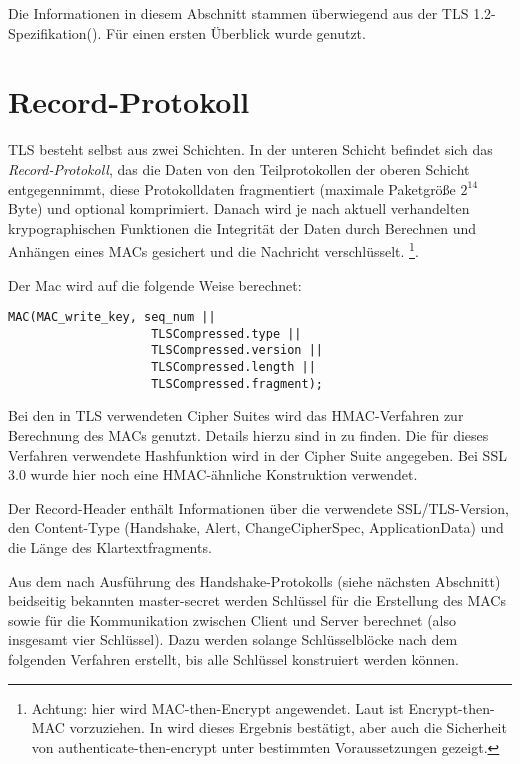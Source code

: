 \documentclass[
    12pt,
    headings=small,
    parskip=half,           %
    bibliography=totoc,
    numbers=noenddot,       %
    open=any,               %
    ]{scrreprt}
\newcommand{\mastersecret}		{master-secret}
\begin{document}
Die Informationen in diesem Abschnitt stammen überwiegend aus der TLS 1.2-Spezifikation(\cite{tls12}). Für einen ersten Überblick wurde \cite{eckert13} genutzt.

\section{Record-Protokoll}

TLS besteht selbst aus zwei Schichten. In der unteren Schicht befindet sich das \emph{Record-Protokoll}, das die Daten von den Teilprotokollen der oberen Schicht entgegennimmt, diese Protokolldaten fragmentiert (maximale Paketgröße \(2^{14}\) Byte) und optional komprimiert. Danach wird je nach aktuell verhandelten krypographischen Funktionen die Integrität der Daten durch Berechnen und Anhängen eines MACs gesichert und die Nachricht verschlüsselt.
\footnote{Achtung: hier wird MAC-then-Encrypt angewendet. Laut \cite{AE2000} ist Encrypt-then-MAC vorzuziehen. In \cite{krawczyk01} wird dieses Ergebnis bestätigt, aber auch die Sicherheit von authenticate-then-encrypt unter bestimmten Voraussetzungen gezeigt.}. 

Der Mac wird auf die folgende Weise berechnet:
\begin{lstlisting}
MAC(MAC_write_key, seq_num ||
					TLSCompressed.type ||
					TLSCompressed.version ||
					TLSCompressed.length ||
					TLSCompressed.fragment);
\end{lstlisting}
Bei den in TLS verwendeten Cipher Suites wird das HMAC-Verfahren zur Berechnung des MACs genutzt. Details hierzu sind in \cite{hmac97} zu finden. Die für dieses Verfahren verwendete Hashfunktion wird in der Cipher Suite angegeben. Bei SSL 3.0 wurde hier noch eine HMAC-ähnliche Konstruktion verwendet.

Der Record-Header enthält Informationen über die verwendete SSL/TLS-Version, den Content-Type (Handshake, Alert, ChangeCipherSpec, ApplicationData) und die Länge des Klartextfragments.

Aus dem nach Ausführung des Handshake-Protokolls (siehe nächsten Abschnitt) beidseitig bekannten \mastersecret{} werden Schlüssel für die Erstellung des MACs sowie für die Kommunikation zwischen Client und Server berechnet (also insgesamt vier Schlüssel). Dazu werden solange Schlüsselblöcke nach dem folgenden Verfahren erstellt, bis alle Schlüssel konstruiert werden können. 
\end{document}
